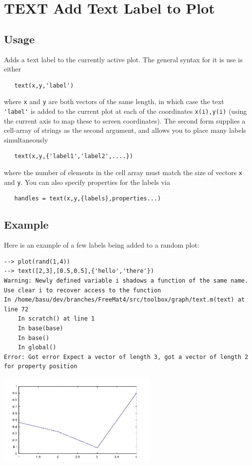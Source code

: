 \section{TEXT Add Text Label to Plot}

\subsection{Usage}

Adds a text label to the currently active plot.  The general
syntax for it is use is either
\begin{verbatim}
   text(x,y,'label')
\end{verbatim}
where \verb|x| and \verb|y| are both vectors of the same length, in which
case the text \verb|'label'| is added to the current plot at each of the
coordinates \verb|x(i),y(i)| (using the current axis to map these to screen
coordinates).  The second form supplies a cell-array of strings
as the second argument, and allows you to place many labels simultaneously
\begin{verbatim}
   text(x,y,{'label1','label2',....})
\end{verbatim}
where the number of elements in the cell array must match the size of
vectors \verb|x| and \verb|y|.  You can also specify properties for the labels
via
\begin{verbatim}
   handles = text(x,y,{labels},properties...)
\end{verbatim}
\subsection{Example}

Here is an example of a few labels being added to a random plot:
\begin{verbatim}
--> plot(rand(1,4))
--> text([2,3],[0.5,0.5],{'hello','there'})
Warning: Newly defined variable i shadows a function of the same name.  Use clear i to recover access to the function
In /home/basu/dev/branches/FreeMat4/src/toolbox/graph/text.m(text) at line 72
    In scratch() at line 1
    In base(base)
    In base()
    In global()
Error: Got error Expect a vector of length 3, got a vector of length 2 for property position
\end{verbatim}


\centerline{\includegraphics[width=8cm]{text1}}

